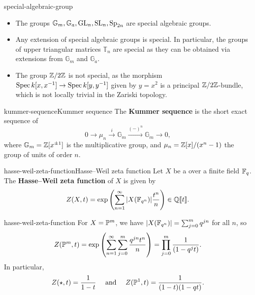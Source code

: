 \begin{example}{special-algebraic-group}
    \begin{itemize}
        \item The groups $\mathbb{G}_m, \mathbb{G}_a, \textup{GL}_n, \textup{SL}_n, \textup{Sp}_{2n}$ are special algebraic groups.
        \item Any extension of special algebraic groups is special. In particular, the groups of upper triangular matrices $\mathbb{T}_n$ are special as they can be obtained via extensions from $\mathbb{G}_m$ and $\mathbb{G}_a$.
        \item The group $\mathbb{Z}/2\mathbb{Z}$ is not special, as the morphism $\operatorname{Spec} k[x, x^{-1}] \to \operatorname{Spec} k[y, y^{-1}]$ given by $y = x^2$ is a principal $\mathbb{Z}/2\mathbb{Z}$-bundle, which is not locally trivial in the Zariski topology.
    \end{itemize}
\end{example}

\begin{topic}{kummer-sequence}{Kummer sequence}
    The \textbf{Kummer sequence} is the short exact sequence of 
    \[ 0 \to \mu_n \xrightarrow{i} \mathbb{G}_m \xrightarrow{(-)^n} \mathbb{G}_m \to 0 , \]
    where $\mathbb{G}_m = \mathbb{Z}[x^{\pm 1}]$ is the multiplicative group, and $\mu_n = \mathbb{Z}[x] / (x^n - 1)$ the group of units of order $n$.
\end{topic}

\begin{topic}{hasse-weil-zeta-function}{Hasse--Weil zeta function}
    Let $X$ be a  over a finite field $\mathbb{F}_q$. The \textbf{Hasse--Weil zeta function} of $X$ is given by
    \[ Z(X, t) = \exp \left( \sum_{n = 1}^{\infty} |X(\mathbb{F}_{q^n})| \frac{t^n}{n} \right) \in \mathbb{Q} \llbracket t \rrbracket . \]
\end{topic}

\begin{example}{hasse-weil-zeta-function}
    For $X = \mathbb{P}^m$, we have $|X(\mathbb{F}_{q^n})| = \sum_{j = 0}^{m} q^{jn}$ for all $n$, so
    \[ Z(\mathbb{P}^m, t) = \exp \left( \sum_{n = 1}^{\infty} \sum_{j = 0}^{m} \frac{q^{jn} t^n}{n} \right) = \prod_{j = 0}^{m} \frac{1}{(1 - q^j t)} . \]
    In particular,
    \[ Z(\star, t) = \frac{1}{1 - t} \quad \textup{ and } \quad Z(\mathbb{P}^1, t) = \frac{1}{(1 - t)(1 - qt)} . \]
\end{example}

